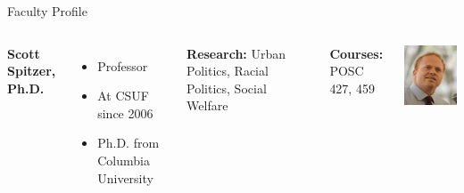 \documentclass[10pt]{beamer}
\newlength{\imageheight}
\begin{document}
        \begin{frame}{Faculty Profile}
        \begin{columns}[t]
        \textbf{Scott Spitzer, Ph.D.}
        \begin{itemize}
        \item Professor
        \item At CSUF since 2006
        \item Ph.D. from Columbia University
        \end{itemize}
        
        \textbf{Research:} Urban Politics, Racial Politics, Social Welfare
        
        \textbf{Courses:} POSC 427, 459
        
        \vspace*{0.5cm}
        \includegraphics[height=\imageheight]{images/spitzer.png}
        \end{columns}
        \end{frame}
        
\end{document}
